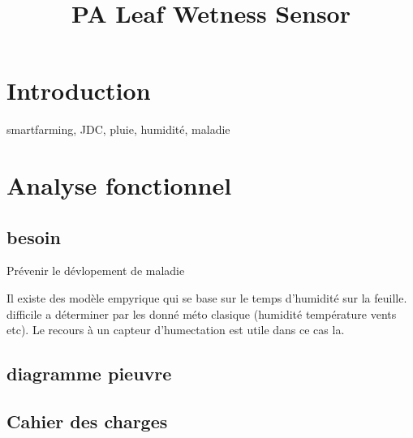 \documentclass[a4paper,11pt,twoside,openright]{article} %
\begin{document}
\title{PA Leaf Wetness Sensor}

\maketitle

\newpage

\section{Introduction}
smartfarming, JDC, pluie, humidité, maladie

\section{Analyse fonctionnel}
\subsection{besoin}
Prévenir le dévlopement de maladie

Il existe des modèle empyrique qui se base sur le temps d'humidité sur la feuille. difficile a déterminer par les donné méto clasique (humidité température vents etc). Le recours à un capteur d'humectation est utile dans ce cas la.

\subsection{diagramme pieuvre}

\subsection{Cahier des charges}
\end{document}
